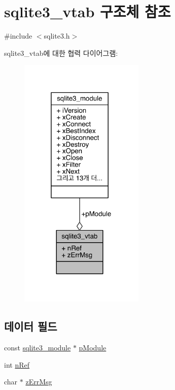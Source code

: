 \hypertarget{structsqlite3__vtab}{}\section{sqlite3\+\_\+vtab 구조체 참조}
\label{structsqlite3__vtab}


{\ttfamily \#include $<$sqlite3.\+h$>$}



sqlite3\+\_\+vtab에 대한 협력 다이어그램\+:
\nopagebreak
\begin{figure}[H]
\begin{center}
\leavevmode
\includegraphics[width=169pt]{d0/d20/structsqlite3__vtab__coll__graph}
\end{center}
\end{figure}
\subsection*{데이터 필드}
\begin{DoxyCompactItemize}
\item 
const \hyperlink{structsqlite3__module}{sqlite3\+\_\+module} $\ast$ \hyperlink{structsqlite3__vtab_a4ef8198ca611b73a9b23054dd1e91e2b}{p\+Module}
\item 
int \hyperlink{structsqlite3__vtab_ab3c80d385849bdd82363a0df7d6fcba8}{n\+Ref}
\item 
char $\ast$ \hyperlink{structsqlite3__vtab_afc50eadfdd7cef876633d460deba48d6}{z\+Err\+Msg}
\end{DoxyCompactItemize}


